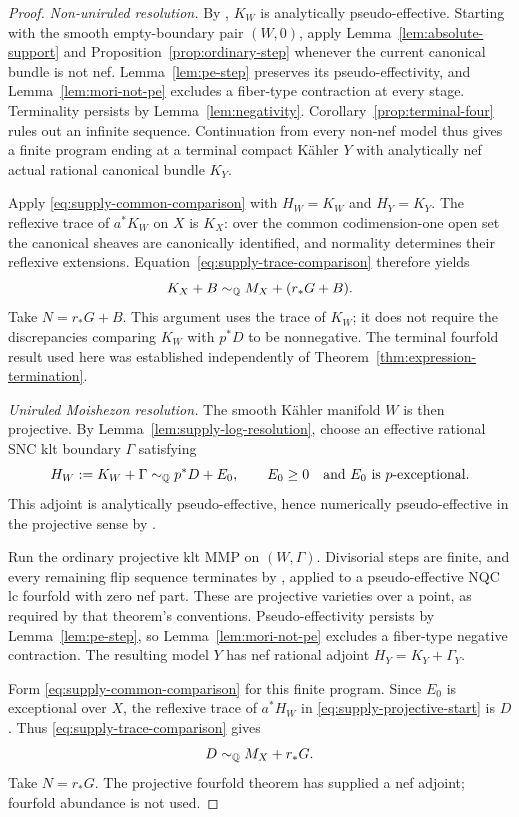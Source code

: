 \begin{proof}
\medskip\noindent
\textit{Non-uniruled resolution.}
By \cite[Theorem~1.1]{Ou2025}, $K_W$ is analytically pseudo-effective.
Starting with the smooth empty-boundary pair $(W,0)$, apply
Lemma~\ref{lem:absolute-support} and Proposition~\ref{prop:ordinary-step}
whenever the current canonical bundle is not nef.
Lemma~\ref{lem:pe-step} preserves its
pseudo-effectivity, and Lemma~\ref{lem:mori-not-pe} excludes a
fiber-type contraction at every stage.  Terminality persists by
Lemma~\ref{lem:negativity}.  Corollary~\ref{prop:terminal-four} rules
out an infinite sequence.  Continuation from every non-nef model thus
gives a finite program ending at a terminal compact Kähler $Y$ with
analytically nef actual rational canonical bundle $K_Y$.

Apply \eqref{eq:supply-common-comparison} with $H_W=K_W$ and $H_Y=K_Y$.
The reflexive trace of $a^*K_W$ on $X$ is $K_X$: over the common
codimension-one open set the canonical sheaves are canonically
identified, and normality determines their reflexive extensions.
Equation~\eqref{eq:supply-trace-comparison} therefore yields
\[
 K_X+B\sim_{\mathbb Q} M_X+(r_*G+B).
\]
Take $N=r_*G+B$.  This argument uses the trace of $K_W$; it does not
require the discrepancies comparing $K_W$ with $p^*D$ to be
nonnegative.  The terminal fourfold result used here was established
independently of Theorem~\ref{thm:expression-termination}.

\medskip\noindent
\textit{Uniruled Moishezon resolution.}
The smooth Kähler manifold $W$ is then projective.  By
Lemma~\ref{lem:supply-log-resolution}, choose an effective rational SNC
klt boundary $\Gamma$ satisfying
\begin{equation}\label{eq:supply-projective-start}
 H_W:=K_W+\Gamma\sim_{\mathbb Q} p^*D+E_0,
 \qquad E_0\geq0\quad\text{and }E_0\text{ is }p\text{-exceptional}.
\end{equation}
This adjoint is analytically pseudo-effective, hence numerically
pseudo-effective in the projective sense by
\cite[Proposition~1.2]{BDPP2013}.

Run the ordinary projective klt MMP on $(W,\Gamma)$.  Divisorial steps
are finite, and every remaining flip sequence terminates by
\cite[Theorem~1.1]{CT2023}, applied to a pseudo-effective NQC lc
fourfold with zero nef part.  These are projective varieties over a
point, as required by that theorem's conventions.  Pseudo-effectivity
persists by Lemma~\ref{lem:pe-step}, so Lemma~\ref{lem:mori-not-pe}
excludes a fiber-type negative contraction.  The resulting model $Y$ has nef
rational adjoint $H_Y=K_Y+\Gamma_Y$.

Form \eqref{eq:supply-common-comparison} for this finite program.
Since $E_0$ is exceptional over $X$, the reflexive trace of
$a^*H_W$ in \eqref{eq:supply-projective-start} is $D$.  Thus
\eqref{eq:supply-trace-comparison} gives
\[
 D\sim_{\mathbb Q} M_X+r_*G.
\]
Take $N=r_*G$.  The projective fourfold theorem has supplied a nef
adjoint; fourfold abundance is not used.
\end{proof}
